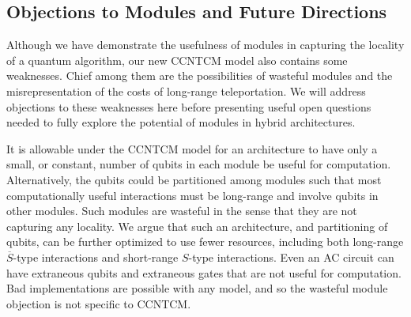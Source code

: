 

\subsection{Objections to Modules and Future Directions}
\label{subsec:module-size}

Although we have demonstrate the usefulness of modules in capturing
the locality of a quantum algorithm, our new \textsf{CCNTCM} model also
contains some weaknesses. Chief among them are the possibilities of
wasteful modules
and the misrepresentation of the costs of long-range teleportation. We will
address objections to these weaknesses here before presenting useful
open questions needed to fully explore the potential of modules in
hybrid architectures.

It is allowable under the \textsf{CCNTCM} model for an architecture
to have only a small,
or constant, number of qubits in each module be useful for computation.
Alternatively, the qubits could be partitioned among modules such that most
computationally useful interactions must be long-range and involve
qubits in other modules.
Such modules are wasteful in the sense that they are not capturing any
locality.
We argue that such an architecture, and partitioning of qubits, can be
further optimized to use fewer resources, including both long-range
$\overline{S}$-type interactions and short-range $S$-type interactions.
Even an \textsf{AC} circuit can have extraneous
qubits and extraneous gates that are not useful for computation.
Bad implementations are possible with any model, and so the wasteful module
objection is not specific to \textsf{CCNTCM}.

